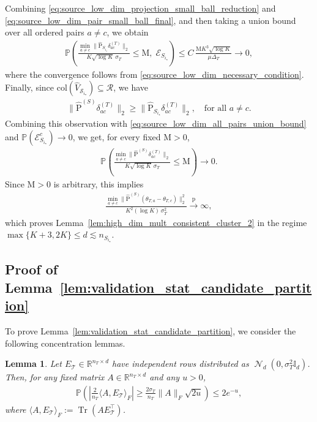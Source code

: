 \documentclass[10pt]{article}
\newtheorem{lemma}{Lemma}
\newcommand{\R}{\mathbb R}
\newcommand{\convp}{\xrightarrow{\mathrm{p}}}
\newcommand{\col}{\mathrm{col}}
\newcommand{\Id}{\mathbb I}
\newcommand{\wh}{\widehat}
\DeclareMathOperator{\dnorm}{\mathcal N}
\newcommand{\calT}{\mathcal T}
\newcommand{\trg}{T}
\newcommand{\nT}{n_{\trg}}
\newcommand{\sigmaT}{\sigma_{\trg}}
\newcommand{\thetamcT}[1]{\theta_{\trg,#1}}
\newcommand{\DeltaT}{\Delta_{\trg}}
\newcommand{\calS}{\mathcal S}
\newcommand{\src}{S}
\newcommand{\nSm}[1]{n_{\src_{#1}}}
\newcommand{\Pest}{\wh{\mathrm P}}
\begin{document}
Combining \eqref{eq:source_low_dim_projection_small_ball_reduction} and \eqref{eq:source_low_dim_pair_small_ball_final}, and then taking a union bound over all ordered pairs $a\neq c$, we obtain
\begin{align}
\label{eq:source_low_dim_all_pairs_union_bound}
    \mathbb P\left(\frac{\min_{a\neq c}\|\widehat{\mathrm P}_{\src_{i_\star}}\delta_{ac}^{(\trg)}\|_2}{K\sqrt{\log K}\,\sigmaT}\le \mathrm M,\;\mathcal E_{\src_{i_\star}}\right)\le C\,\frac{\mathrm M K^3\sqrt{\log K}}{\mu\DeltaT}\to 0,
\end{align}
where the convergence follows from \eqref{eq:source_low_dim_necessary_condition}. Finally, since $\col(\wh V_{\calS_{i_\star}})\subseteq\mathcal R$, we have
\begin{align}
    \|\Pest^{(\src)}\delta_{ac}^{(\trg)}\|_2\ge \|\widehat{\mathrm P}_{\src_{i_\star}}\delta_{ac}^{(\trg)}\|_2, \quad \mbox{for all $a\neq c$.}
\end{align}
Combining this observation with \eqref{eq:source_low_dim_all_pairs_union_bound} and $\mathbb P(\mathcal E_{\src_{i_\star}}^c)\to0$, we get, for every fixed $\mathrm M>0$,
\begin{align}
    \mathbb P\left(\frac{\min_{a\neq c}\|\Pest^{(\src)}\delta_{ac}^{(\trg)}\|_2}{K\sqrt{\log K}\,\sigmaT}\le \mathrm M\right)\to0.
\end{align}
Since $\mathrm M>0$ is arbitrary, this implies
\begin{align}
    \frac{\displaystyle \min_{a\neq c}\|\Pest^{(\src)}(\thetamcT{a}-\thetamcT{c})\|_2^2}{K^2(\log K)\,\sigmaT^2}\convp\infty,
\end{align}
which proves Lemma~\ref{lem:high_dim_mult_consistent_cluster_2} in the regime $\max\{K+3,2K\}\le d\lesssim \nSm{i_\star}$.

\subsection{Proof of Lemma~\ref{lem:validation_stat_candidate_partition}}
To prove Lemma~\ref{lem:validation_stat_candidate_partition}, we consider the following concentration lemmas.

\begin{lemma}
\label{lem:validation_linear_gaussian_concentration}
Let $E_\calT\in\R^{\nT\times d}$ have independent rows distributed as
$\dnorm_d(0,\sigmaT^2\Id_d)$. Then, for any fixed matrix
$A\in\R^{\nT\times d}$ and any $u>0$,
\begin{align}
    \mathbb P\left(\left|\frac{2}{\nT}\langle A,E_\calT\rangle_F\right|
    \ge \frac{2\sigmaT}{\nT}\|A\|_F\sqrt{2u}\right)\le 2e^{-u},
\end{align}
where $\langle A,E_\calT\rangle_F:=\operatorname{Tr}(AE^\top_\calT)$.
\end{lemma}
\end{document}
